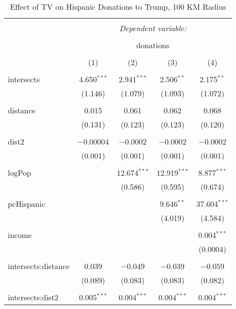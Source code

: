 
\begin{table}[!htbp] \centering 
  \caption{Effect of TV on Hispanic Donations to Trump, 100 KM Radius} 
  \label{} 
\begin{tabular}{@{\extracolsep{-5pt}}lcccc} 
\\[-1.8ex]\hline 
\hline \\[-1.8ex] 
 & \multicolumn{4}{c}{\textit{Dependent variable:}} \\ 
\cline{2-5} 
\\[-1.8ex] & \multicolumn{4}{c}{donations} \\ 
\\[-1.8ex] & (1) & (2) & (3) & (4)\\ 
\hline \\[-1.8ex] 
 intersects & 4.650$^{***}$ & 2.941$^{***}$ & 2.506$^{**}$ & 2.175$^{**}$ \\ 
  & (1.146) & (1.079) & (1.093) & (1.072) \\ 
  & & & & \\ 
 distance & 0.015 & 0.061 & 0.062 & 0.068 \\ 
  & (0.131) & (0.123) & (0.123) & (0.120) \\ 
  & & & & \\ 
 dist2 & $-$0.00004 & $-$0.0002 & $-$0.0002 & $-$0.0002 \\ 
  & (0.001) & (0.001) & (0.001) & (0.001) \\ 
  & & & & \\ 
 logPop &  & 12.674$^{***}$ & 12.919$^{***}$ & 8.877$^{***}$ \\ 
  &  & (0.586) & (0.595) & (0.674) \\ 
  & & & & \\ 
 pcHispanic &  &  & 9.646$^{**}$ & 37.604$^{***}$ \\ 
  &  &  & (4.019) & (4.584) \\ 
  & & & & \\ 
 income &  &  &  & 0.004$^{***}$ \\ 
  &  &  &  & (0.0004) \\ 
  & & & & \\ 
 intersects:distance & 0.039 & $-$0.049 & $-$0.039 & $-$0.059 \\ 
  & (0.089) & (0.083) & (0.083) & (0.082) \\ 
  & & & & \\ 
 intersects:dist2 & 0.005$^{***}$ & 0.004$^{***}$ & 0.004$^{***}$ & 0.004$^{***}$ \\ 

\end{tabular}
\end{table}
